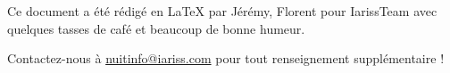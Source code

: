 \documentclass[12pt, a4paper]{article}
\newcommand{\espace}{\vspace{.8cm}}
\newcommand{\authors}{Jérémy, Florent}
\begin{document}

\espace\vfill{}
Ce document a été rédigé en \LaTeX{} par \authors{} pour IarissTeam avec quelques tasses de café et beaucoup de bonne humeur.

Contactez-nous à \href{mailto:nuitinfo@iariss.com}{nuitinfo@iariss.com} pour tout renseignement supplémentaire !
\end{document}
